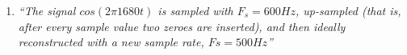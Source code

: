 \documentclass{article}
\begin{document}
\begin{enumerate}
\begin{enumerate}
            \item %
                \emph{``The signal $cos(2\pi1680t)$ is sampled with $F_s = 600 Hz$, up-sampled (that is, after
                        every sample value two zeroes are inserted), and then ideally reconstructed with a
                        new sample rate, $Fs = 500 Hz$''}
                \\
        \end{enumerate}
    \end{enumerate}
\end{document}
